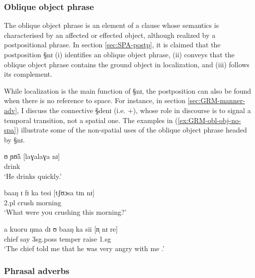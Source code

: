 \subsubsection{Oblique object phrase}
\label{sec:GRM-obl-phrase}

The oblique object phrase is an element of a clause whose  semantics is
characterised by an  affected or effected object, although realized by a
postpositional phrase.  In section \ref{sec:SPA-postp},  it is claimed that the
postposition {\S nɪ} (i) identifies an oblique object phrase, (ii) conveys that
the oblique object phrase contains the ground object in localization, and
(iii) follows its complement. 

While localization is
the main function of  {\S nɪ}, the postposition can also be found when there
is no  reference to space. For instance, in section \ref{sec:GRM-manner-adv}, I
discuss the connective {\S denɪ} (i.e. {\advl}+{\postp}), whose role in
discourse is to signal a temporal transition, not a spatial one.  The
examples in (\ref{ex:GRM-obl-obj-no-spa}) illustrate some of the non-spatial
uses
of the oblique object phrase headed by {\S nɪ}.


\begin{exe}
\ex\label{ex:GRM-obl-obj-no-spa}
\begin{xlist}
\ex
\gll ʊ ɲʊ̃ã  [laɣalaɣa nɪ]  \\
      {\psg} drink {\advm} {\postp}    \\
\glt  `He drinks quickly.' 

\ex
\gll baaŋ ɪ fɪ ka tesi [tʃʊɔsa tɪn nɪ]\\
 {\q} {\sc 2.pl} {\pst} {\egr} crush  morning {\art} {\postp}    \\
\glt  `What were you crushing this morning?' 

\ex\label{ex:GRM-obl-obj-no-spa-foc}
\gll a kuoru ŋma dɪ ʊ baaŋ ka sii [n̩ nɪ re]\\
{\art} chief say {\comp} {\sc 3sg.poss} temper {\egr} raise {\sc 1.sg} {\postp}
{\foc}\\
\glt  `The chief told me that he was very angry with me .' 

\end{xlist}
\end{exe}


\subsubsection{Phrasal adverbs}
\label{sec:GRM-obl-phrase}

